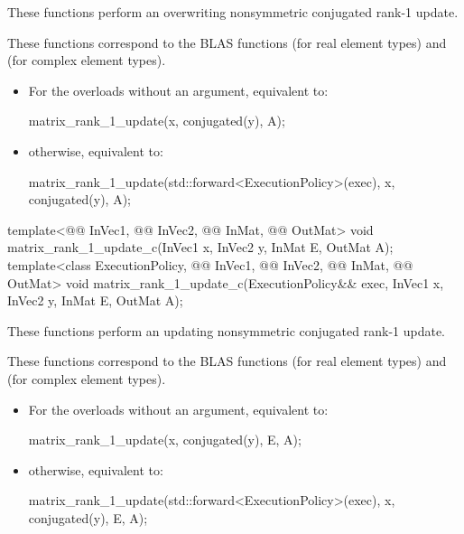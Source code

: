\begin{itemdescr}
\pnum
These functions perform an overwriting nonsymmetric conjugated rank-1 update.
\begin{note}
These functions correspond to the BLAS functions
 (for real element types) and
 (for complex element types)\supercite{blas2}.
\end{note}

\pnum
\effects
\begin{itemize}
\item
For the overloads without an  argument,
equivalent to:
\begin{codeblock}
matrix_rank_1_update(x, conjugated(y), A);
\end{codeblock}
\item
otherwise, equivalent to:
\begin{codeblock}
matrix_rank_1_update(std::forward<ExecutionPolicy>(exec), x, conjugated(y), A);
\end{codeblock}
\end{itemize}
\end{itemdescr}

%
\begin{itemdecl}
template<@@ InVec1, @@ InVec2, @@ InMat, @@ OutMat>
  void matrix_rank_1_update_c(InVec1 x, InVec2 y, InMat E, OutMat A);
template<class ExecutionPolicy, @@ InVec1, @@ InVec2, @@ InMat,
         @@ OutMat>
  void matrix_rank_1_update_c(ExecutionPolicy&& exec, InVec1 x, InVec2 y, InMat E, OutMat A);
\end{itemdecl}

\begin{itemdescr}
\pnum
These functions perform an updating nonsymmetric conjugated rank-1 update.
\begin{note}
These functions correspond to the BLAS functions
 (for real element types) and
 (for complex element types)\supercite{blas2}.
\end{note}

\pnum
\effects
\begin{itemize}
\item
For the overloads without an  argument,
equivalent to:
\begin{codeblock}
matrix_rank_1_update(x, conjugated(y), E, A);
\end{codeblock}
\item
otherwise, equivalent to:
\begin{codeblock}
matrix_rank_1_update(std::forward<ExecutionPolicy>(exec), x, conjugated(y), E, A);
\end{codeblock}
\end{itemize}
\end{itemdescr}

